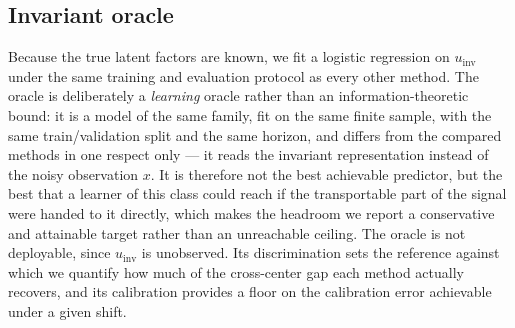 %
%



\subsection{Invariant oracle}
Because the true latent factors are known, we fit a logistic regression on
$u_{\mathrm{inv}}$ under the same training and evaluation protocol as every
other method. The oracle is deliberately a \emph{learning} oracle rather than an
information-theoretic bound: it is a model of the same family, fit on the same
finite sample, with the same train/validation split and the same horizon, and
differs from the compared methods in one respect only --- it reads the invariant
representation instead of the noisy observation $x$. It is therefore not the
best achievable predictor, but the best that a learner of this class could reach
if the transportable part of the signal were handed to it directly, which makes
the headroom we report a conservative and attainable target rather than an
unreachable ceiling. The oracle is not deployable, since $u_{\mathrm{inv}}$ is
unobserved. Its discrimination sets the reference against which we quantify how
much of the cross-center gap each method actually recovers, and its calibration
provides a floor on the calibration error achievable under a given shift.



